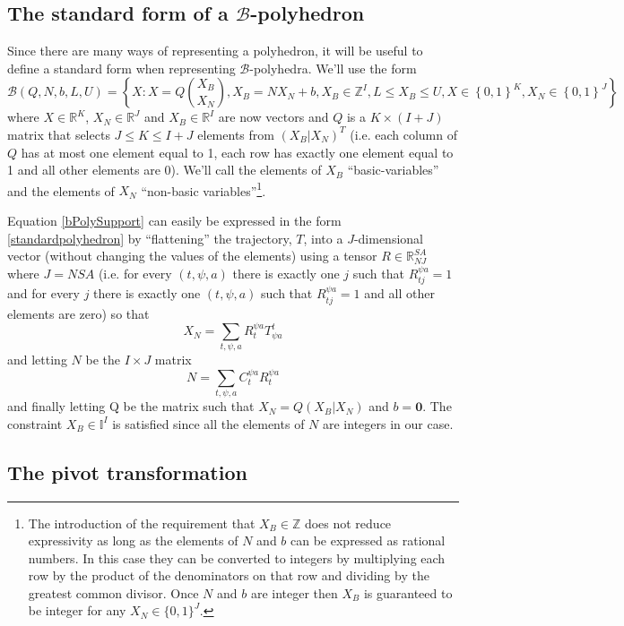 \documentclass{article}
\begin{document}
\subsection{The standard form of a $\mathcal{B}$-polyhedron}

Since there are many ways of representing a polyhedron, it will be useful to define a standard form when representing $\mathcal{B}$-polyhedra. We'll use the form
\begin{equation}
\mathcal{B}(Q,N,b,L,U) = \left\{X: X = Q{X_B\choose X_N}, X_B = NX_N + b, X_B\in\mathbb{Z}^I, L \le X_B \le U, X \in \left\{ 0,1\right\}^K, X_N \in \left\{0,1\right\}^J \right\}
\label{standardpolyhedron}
\end{equation}
where $X\in \mathbb{R}^K$, $X_N\in\mathbb{R}^J$ and $X_B\in\mathbb{R}^I$ are now vectors and $Q$ is a $K\times (I+J)$ matrix that selects $J \le K \le I+J$ elements from $(X_B|X_N)^T$ (i.e. each column of $Q$ has at most one element equal to 1, each row has exactly one element equal to 1 and all other elements are 0). We'll call the elements of $X_B$ ``basic-variables'' and the elements of $X_N$ ``non-basic variables''\footnote{The introduction of the requirement that $X_B \in \mathbb{Z}$ does not reduce expressivity as long as the elements of $N$ and $b$ can be expressed as rational numbers. In this case they can be converted to integers by multiplying each row by the product of the denominators on that row and dividing by the greatest common divisor. Once $N$ and $b$ are integer then $X_B$ is guaranteed to be integer for any $X_N\in\{0,1\}^J$.}.

Equation \eqref{bPolySupport} can easily be expressed in the form \eqref{standardpolyhedron} by ``flattening'' the trajectory, $T$, into a $J$-dimensional vector (without changing the values of the elements) using a tensor $R\in\mathbb{R}^{SA}_{NJ}$ where $J=NSA$ (i.e. for every $(t, \psi, a)$ there is exactly one $j$ such that $R^{\psi a}_{t j} = 1$ and for every $j$ there is exactly one $(t,\psi,a)$ such that $R^{\psi a}_{t j} = 1$ and all other elements are zero) so that
\[
X_N = \sum_{t,\psi,a}R^{\psi a}_t T^t_{\psi a}
\]
and letting $N$ be the $I\times J$ matrix
\[
N = \sum_{t,\psi,a} C^{\psi a}_t R^{\psi a}_t
\]
and finally letting Q be the matrix such that $X_N = Q(X_B|X_N)$ and $b = \mathbf{0}$. The constraint $X_B\in\mathbb{I}^I$ is satisfied since all the elements of $N$ are integers in our case.

\subsection{The pivot transformation}
\end{document}
